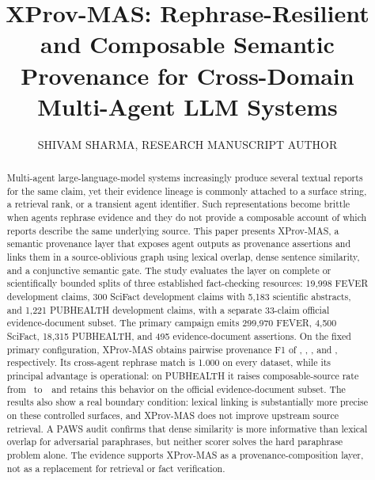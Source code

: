 \documentclass{ieeeaccess}
\begin{document}
\newlength{\xfigwd}
\setlength{\xfigwd}{\columnwidth}

\title{XProv-MAS: Rephrase-Resilient and Composable Semantic Provenance for Cross-Domain Multi-Agent LLM Systems}

\author{\uppercase{Shivam Sharma}, \uppercase{Research Manuscript Author}}
\address[1]{Department of Computer Science and Engineering, India (e-mail: research@example.org)}
\address[2]{Independent Research Collaboration}

\begin{abstract}
Multi-agent large-language-model systems increasingly produce several textual reports for the same claim, yet their evidence lineage is commonly attached to a surface string, a retrieval rank, or a transient agent identifier. Such representations become brittle when agents rephrase evidence and they do not provide a composable account of which reports describe the same underlying source. This paper presents XProv-MAS, a semantic provenance layer that exposes agent outputs as provenance assertions and links them in a source-oblivious graph using lexical overlap, dense sentence similarity, and a conjunctive semantic gate. The study evaluates the layer on complete or scientifically bounded splits of three established fact-checking resources: 19,998 FEVER development claims, 300 SciFact development claims with 5,183 scientific abstracts, and 1,221 PUBHEALTH development claims, with a separate 33-claim official evidence-document subset. The primary campaign emits 299,970 FEVER, 4,500 SciFact, 18,315 PUBHEALTH, and 495 evidence-document assertions. On the fixed primary configuration, XProv-MAS obtains pairwise provenance F1 of \FEVERXProvFOne, \SciFactXProvFOne, \PubHealthXProvFOne, and \PubHealthEvidenceXProvFOne, respectively. Its cross-agent rephrase match is 1.000 on every dataset, while its principal advantage is operational: on PUBHEALTH it raises composable-source rate from \PubHealthLexicalComposable\ to\ \PubHealthXProvComposable\ and retains this behavior on the official evidence-document subset. The results also show a real boundary condition: lexical linking is substantially more precise on these controlled surfaces, and XProv-MAS does not improve upstream source retrieval. A PAWS audit confirms that dense similarity is more informative than lexical overlap for adversarial paraphrases, but neither scorer solves the hard paraphrase problem alone. The evidence supports XProv-MAS as a provenance-composition layer, not as a replacement for retrieval or fact verification.
\end{abstract}
\end{document}
